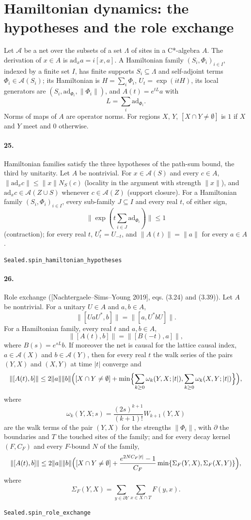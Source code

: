 \documentclass[11pt]{article}
\begin{document}
\section*{Hamiltonian dynamics: the hypotheses and the role exchange}
Let $\mathcal A$ be a net over the subsets of a set $\Lambda$ of sites in a C*-algebra $A$. The derivation of $x \in A$ is $\mathrm{ad}_x a = i[x, a]$. A Hamiltonian family $(S_i, \Phi_i)_{i \in I}$, indexed by a finite set $I$, has finite supports $S_i \subseteq \Lambda$ and self-adjoint terms $\Phi_i \in \mathcal A(S_i)$; its Hamiltonian is $H = \sum_i \Phi_i$, $U_t = \exp(itH)$, its local generators are $(S_i, \mathrm{ad}_{\Phi_i}, \|\Phi_i\|)$, and $A(t) = e^{tL} a$ with \[L = \sum_i \mathrm{ad}_{\Phi_i}.\] Norms of maps of $A$ are operator norms. For regions $X$, $Y$, $[X \cap Y \neq \emptyset]$ is $1$ if $X$ and $Y$ meet and $0$ otherwise.

\paragraph{25.} Hamiltonian families satisfy the three hypotheses of the path-sum bound, the third by unitarity. Let $A$ be nontrivial. For $x \in \mathcal A(S)$ and every $c \in A$, $\|\mathrm{ad}_x c\| \le \|x\| N_S(c)$ (locality in the argument with strength $\|x\|$), and $\mathrm{ad}_x c \in \mathcal A(Z \cup S)$ whenever $c \in \mathcal A(Z)$ (support closure). For a Hamiltonian family $(S_i, \Phi_i)_{i \in I}$, every sub-family $J \subseteq I$ and every real $t$, of either sign, \[\|\exp(t \sum_{i \in J} \mathrm{ad}_{\Phi_i})\| \le 1\] (contraction); for every real $t$, $U_t^* = U_{-t}$, and $\|A(t)\| = \|a\|$ for every $a \in A$.\par{\footnotesize\texttt{Sealed.spin\_hamiltonian\_hypotheses}}

\paragraph{26.} Role exchange ([Nachtergaele–Sims–Young 2019], eqs. (3.24) and (3.39)). Let $A$ be nontrivial. For a unitary $U \in A$ and $a, b \in A$, \[\|[U a U^*, b]\| = \|[a, U^* b U]\|.\] For a Hamiltonian family, every real $t$ and $a, b \in A$, \[\|[A(t), b]\| = \|[B(-t), a]\|,\] where $B(s) = e^{sL} b$. If moreover the net is causal for the lattice causal index, $a \in \mathcal A(X)$ and $b \in \mathcal A(Y)$, then for every real $t$ the walk series of the pairs $(Y, X)$ and $(X, Y)$ at time $|t|$ converge and \[\|[A(t), b]\| \le 2\|a\|\|b\|\Bigl([X \cap Y \neq \emptyset] + \min\Bigl\{\sum_{k \ge 0} \omega_k(Y, X; |t|), \sum_{k \ge 0} \omega_k(X, Y; |t|)\Bigr\}\Bigr),\] where \[\omega_k(Y, X; s) = \frac{(2s)^{k+1}}{(k+1)!} W_{k+1}(Y, X)\] are the walk terms of the pair $(Y, X)$ for the strengths $\|\Phi_i\|$, with $\partial$ the boundaries and $T$ the touched sites of the family; and for every decay kernel $(F, C_F)$ and every $F$-bound $N$ of the family, \[\|[A(t), b]\| \le 2\|a\|\|b\|\Bigl([X \cap Y \neq \emptyset] + \frac{e^{2 N C_F |t|} - 1}{C_F} \min\{\Sigma_F(Y, X), \Sigma_F(X, Y)\}\Bigr),\] where \[\Sigma_F(Y, X) = \sum_{y \in \partial Y} \sum_{x \in X \cap T} F(y, x).\]\par{\footnotesize\texttt{Sealed.spin\_role\_exchange}}
\end{document}
